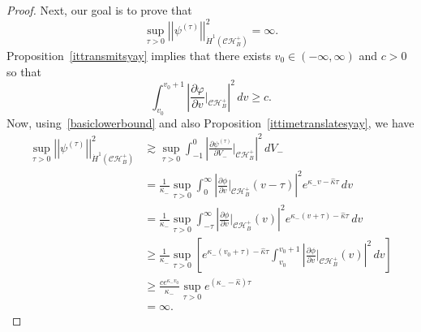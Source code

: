 \documentclass[A4,10pt]{article}
\begin{document}
\begin{proof}
Next, our goal is to prove that
\begin{equation}\label{toblowup}
\sup_{\tau > 0}\left\vert\left\vert \psi^{(\tau)}\right\vert\right\vert^2_{\dot{H}^1\left(\mathcal{CH}^+_B\right)} = \infty.
\end{equation}
Proposition~\ref{ittransmitsyay} implies that there exists $v_0 \in (-\infty,\infty)$ and $c > 0$ so that
\begin{equation}\label{basiclowerbound}
\int_{v_0}^{v_0+1}\left|\frac{\partial\varphi}{\partial v}|_{\mathcal{CH}^+_B}\right|^2\, dv \geq c.
\end{equation}
Now, using~\eqref{basiclowerbound} and also Proposition~\ref{ittimetranslatesyay}, we have
\begin{align}\label{lowerboundforthewin}
\sup_{\tau > 0}\left\vert\left\vert \psi^{(\tau)}\right\vert\right\vert^2_{\dot{H}^1\left(\mathcal{CH}^+_B\right)} &\gtrsim \sup_{\tau > 0}\int_{-1}^0\left|\frac{\partial \psi^{(\tau)}}{\partial V_-}|_{\mathcal{CH}^+_B}\right|^2\, dV_- 
\\ \nonumber &= \frac{1}{\kappa_-}\sup_{\tau > 0}\int_0^{\infty}\left|\frac{\partial \phi}{\partial v}|_{\mathcal{CH}^+_B}\left(v-\tau\right)\right|^2 e^{\kappa_- v-\hat{\kappa}\tau}\, dv 
\\ \nonumber &=\frac{1}{\kappa_-}\sup_{\tau > 0}\int_{-\tau}^{\infty}\left|\frac{\partial \phi}{\partial v}|_{\mathcal{CH}^+_B}\left(v\right)\right|^2 e^{\kappa_- \left(v+\tau\right)-\hat{\kappa}\tau}\, dv 
\\ \nonumber &\geq \frac{1}{\kappa_-}\sup_{\tau > 0}\left[e^{\kappa_-\left(v_0+\tau\right)-\hat{\kappa}\tau}\int_{v_0}^{v_0+1}\left|\frac{\partial \phi}{\partial v}|_{\mathcal{CH}^+_B}\left(v\right)\right|^2 \, dv \right]
\\ \nonumber &\geq \frac{ce^{\kappa_-v_0}}{\kappa_-}\sup_{\tau > 0}e^{\left(\kappa_--\hat{\kappa}\right)\tau}
\\ \nonumber &=\infty.
\end{align}

\end{proof}
\end{document}
